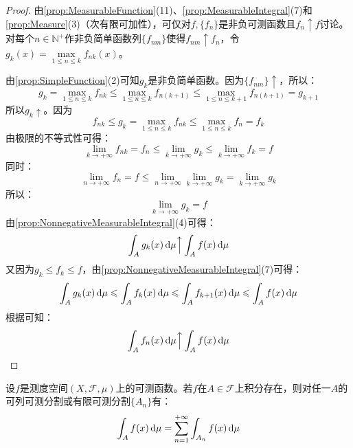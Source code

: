 \begin{proof}
	由\cref{prop:MeasurableFunction}(11)、\cref{prop:MeasurableIntegral}(7)和\cref{prop:Measure}(3)（次有限可加性），可仅对$f,\{f_n\}$是非负可测函数且$f_n\uparrow f$讨论。对每个$n\in\mathbb{N}^+$作非负简单函数列$\{f_{nm}\}$使得$f_{nm}\uparrow f_n$，令$g_k(x)=\max\limits_{1\leqslant n\leqslant k}f_{nk}(x)$。\par
	由\cref{prop:SimpleFunction}(2)可知$g_k$是非负简单函数。因为$\{f_{nm}\}\uparrow$，所以：
	\begin{equation*}
		g_k=\max_{1\leqslant n\leqslant k}f_{nk}\leqslant\max_{1\leqslant n\leqslant k}f_{n(k+1)}\leqslant\max_{1\leqslant n\leqslant k+1}f_{n(k+1)}=g_{k+1}
	\end{equation*}
	所以$g_k\uparrow$。因为
	\begin{equation*}
		f_{nk}\leqslant g_k=\max_{1\leqslant n\leqslant k}f_{nk}\leqslant\max_{1\leqslant n\leqslant k}f_n=f_k
	\end{equation*}
	由极限的不等式性可得：
	\begin{equation*}
		\lim_{k\to+\infty}f_{nk}=f_n\leqslant\lim_{k\to+\infty}g_k\leqslant\lim_{k\to+\infty}f_k=f
	\end{equation*}
	同时：
	\begin{equation*}
		\lim_{n\to+\infty}f_n=f\leqslant\lim_{n\to+\infty}\lim_{k\to+\infty}g_k=\lim_{k\to+\infty}g_k
	\end{equation*}
	所以：
	\begin{equation*}
		\lim_{k\to+\infty}g_k=f
	\end{equation*}
	由\cref{prop:NonnegativeMeasurableIntegral}(4)可得：
	\begin{equation*}
		\int_{A}g_k(x)\mathop{}\!\mathrm{d}\mu\Big\uparrow\int_{A}f(x)\mathop{}\!\mathrm{d}\mu
	\end{equation*}
	又因为$g_k\leqslant f_k\leqslant f$，由\cref{prop:NonnegativeMeasurableIntegral}(7)可得：
	\begin{equation*}
		\int_{A}g_k(x)\mathop{}\!\mathrm{d}\mu\leqslant\int_{A}f_k(x)\mathop{}\!\mathrm{d}\mu\leqslant\int_{A}f_{k+1}(x)\mathop{}\!\mathrm{d}\mu\leqslant\int_{A}f(x)\mathop{}\!\mathrm{d}\mu
	\end{equation*}
	根据可知：
	\begin{equation*}
		\int_{A}f_n(x)\mathop{}\!\mathrm{d}\mu\Big\uparrow\int_{A}f(x)\mathop{}\!\mathrm{d}\mu\qedhere
	\end{equation*}
\end{proof}
\begin{theorem}\label{theo:MeasurableCountableIntegral}
	设$f$是测度空间$(X,\mathscr{F},\mu)$上的可测函数。若$f$在$A\in\mathscr{F}$上积分存在，则对任一$A$的可列可测分割或有限可测分割$\{A_n\}$有：
	\begin{equation*}
		\int_{A}f(x)\mathop{}\!\mathrm{d}\mu=\sum_{n=1}^{+\infty}\int_{A_n}f(x)\mathop{}\!\mathrm{d}\mu
	\end{equation*}
\end{theorem}
